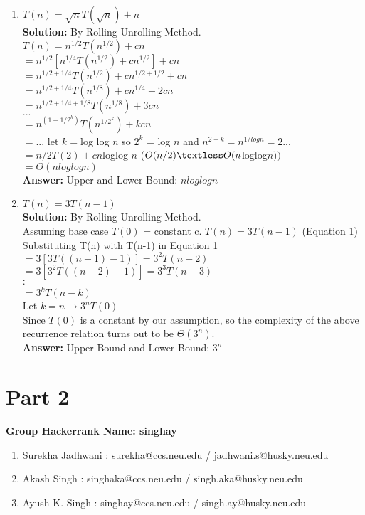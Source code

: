 \documentclass[12pt]{article}
\begin{document}
\begin{enumerate}
\begin{enumerate}
\begin{enumerate}
\item {$ T(n) = \sqrt{n}T(\sqrt{n}) + n  $}\\
\textbf{Solution:}  By Rolling-Unrolling Method.\\
$ T(n) = n^{1/2}T(n^{1/2}) + cn $\\
$= \displaystyle{n^{1/2}\left[ n^{1/4}T\left(n^{1/2}\right) + cn^{1/2} \right] + cn}$\\
$= \displaystyle{n^{1/2 + 1/4}T\left(n^{1/2}\right) + cn^{1/2 + 1/2} + cn}$\\
$= \displaystyle{n^{1/2 + 1/4}T\left(n^{1/8}\right) + cn^{1/4} + 2cn}$\\
$= \displaystyle{n^{1/2 + 1/4 + 1/8}T\left(n^{1/8}\right) + 3cn}$\\
$...$\\
$= \displaystyle{n^(1-1/2^{k}) T(n^{1/2^{k}}) + kcn }$\\
$=...$ let $k = $log log $n$ so $2^{k}$ = log $n$ and $n^{2-k} = n^{1/logn} = 2 ...$\\
$= \displaystyle{n/2T(2) + cn }$loglog $n$ \hfill ($O(n/2) \textless O(n$loglog$n))$\\
$= \displaystyle{\Theta(nloglogn)}$\\
\textbf{Answer:} Upper and Lower Bound: $nloglogn$
\pagebreak
\item {$ T(n) = 3T(n - 1)  $}\\
\textbf{Solution:} By Rolling-Unrolling Method.\\
Assuming base case $T(0)$ = constant c.
$ T(n) = 3T(n - 1)  $ \hfill (Equation 1) \\
Substituting T(n) with T(n-1) in Equation 1\\
$ = 3[ 3T((n - 1) - 1)] = 3^{2}T(n-2) $ \\
$ = 3[3^{2}T((n-2) - 1)] = 3^{3}T(n-3) $ \\
$\cdot$ \\
$\cdot$ \\
$= 3^{k}T(n - k) $\\
Let $k = n \rightarrow 3^{n}T(0)$\\
Since $T(0)$ is a constant by our assumption, so the complexity of the above recurrence relation turns out to be $\Theta(3^{n}).$ \\
\textbf{Answer:} Upper Bound and Lower Bound: $3^{n}$

\end{enumerate}

\end{enumerate}

\section{Part 2}
\textbf{\large{Group Hackerrank Name: singhay }}
\begin{enumerate}
	\item Surekha Jadhwani : surekha@ccs.neu.edu / jadhwani.s@husky.neu.edu
	\item Akash Singh : singhaka@ccs.neu.edu / singh.aka@husky.neu.edu
	\item Ayush K. Singh : singhay@ccs.neu.edu / singh.ay@husky.neu.edu
\end{enumerate}


\end{enumerate}
\end{document}
